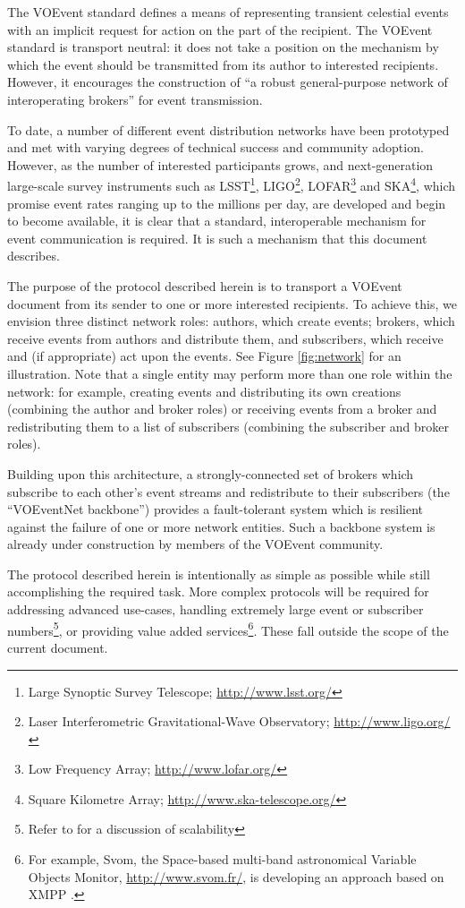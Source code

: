 \documentclass[a4paper,11pt]{ivoa}
\begin{document}
The VOEvent standard \citep{std:VOEVENT2} defines a means of representing
transient celestial events with an implicit request for action on the part of
the recipient. The VOEvent standard is transport neutral: it does not take a
position on the mechanism by which the event should be transmitted from its
author to interested recipients. However, it encourages the construction of
``a robust general-purpose network of interoperating brokers'' for event
transmission.

To date, a number of different event distribution networks have been
prototyped and met with varying degrees of technical success and community
adoption. However, as the number of interested participants grows, and
next-generation large-scale survey instruments such as LSST\footnote{Large
Synoptic Survey Telescope; \url{http://www.lsst.org/}}, LIGO\footnote{Laser
Interferometric Gravitational-Wave Observatory; \url{http://www.ligo.org/}},
LOFAR\footnote{Low Frequency Array; \url{http://www.lofar.org/}} and
SKA\footnote{Square Kilometre Array; \url{http://www.ska-telescope.org/}},
which promise event rates ranging up to the millions per day, are
developed and begin to become available, it is clear that a standard,
interoperable mechanism for event communication is required. It is such a
mechanism that this document describes.

The purpose of the protocol described herein is to transport a VOEvent
document from its sender to one or more interested recipients. To achieve
this, we envision three distinct network roles: authors, which create events;
brokers, which receive events from authors and distribute them, and
subscribers, which receive and (if appropriate) act upon the events. See
Figure \ref{fig:network} for an illustration. Note that a single entity may
perform more than one role within the network: for example, creating events
and distributing its own creations (combining the author and broker roles) or
receiving events from a broker and redistributing them to a list of
subscribers (combining the subscriber and broker roles).

Building upon this architecture, a strongly-connected set of brokers which
subscribe to each other's event streams and redistribute to their subscribers
(the ``VOEventNet backbone'') provides a fault-tolerant system which is
resilient against the failure of one or more network entities. Such a backbone
system is already under construction by members of the VOEvent community.

The protocol described herein is intentionally as simple as possible while
still accomplishing the required task. More complex protocols will be required
for addressing advanced use-cases, handling extremely large event or
subscriber numbers\footnote{Refer to \citet{Swinbank:2014} for a discussion of
scalability}, or providing value added services\footnote{For example, Svom,
the Space-based multi-band astronomical Variable Objects Monitor,
\url{http://www.svom.fr/}, is developing an approach based on XMPP
\citep{SaintAndre:2011}.}. These fall outside the scope of the current
document.
\end{document}
